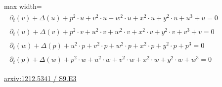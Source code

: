 \documentclass[UTF8,10pt,a4paper,fontset=mac]{ctexart}
\begin{document}
\begin{minipage}{\linewidth}\begin{center}\begin{adjustbox}{max width=\linewidth}$\displaystyle\begin{gathered}\begin{gathered}\partial_{t}(v)+\Delta(u)+p^{2}\cdot u+v^{2}\cdot u+w^{2}\cdot u+x^{2}\cdot u+y^{2}\cdot u+u^{3}+u=0\end{gathered}\\[5pt]\begin{gathered}\partial_{t}(u)+\Delta(v)+p^{2}\cdot v+u^{2}\cdot v+w^{2}\cdot v+x^{2}\cdot v+y^{2}\cdot v+v^{3}+v=0\end{gathered}\\[5pt]\begin{gathered}\partial_{t}(w)+\Delta(p)+u^{2}\cdot p+v^{2}\cdot p+w^{2}\cdot p+x^{2}\cdot p+y^{2}\cdot p+p^{3}=0\end{gathered}\\[5pt]\begin{gathered}\partial_{t}(p)+\Delta(w)+p^{2}\cdot w+u^{2}\cdot w+v^{2}\cdot w+x^{2}\cdot w+y^{2}\cdot w+w^{3}=0\end{gathered}\end{gathered}$\end{adjustbox}\end{center}{\small\href{https://arxiv.org/html/1212.5341#S9.E3}{arxiv:1212.5341 / S9.E3}}\par\end{minipage}\par\vspace{6mm}
\end{document}
